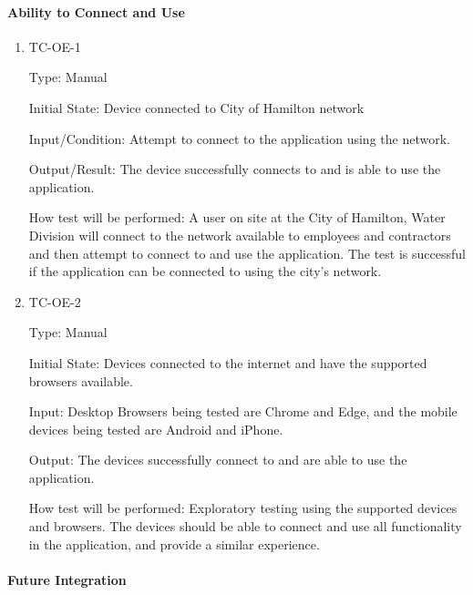\documentclass[12pt, titlepage]{article}
\begin{document}
\paragraph{Ability to Connect and Use}

\begin{enumerate}

  \item{TC-OE-1\\}

    Type: Manual

    Initial State: Device connected to City of Hamilton network

    Input/Condition: Attempt to connect to the application using
    the network.

    Output/Result: The device successfully connects to and is able to
    use the application.

    How test will be performed: A user on site at the City of
    Hamilton, Water Division will connect to the network available to
    employees and contractors and then attempt to connect to and use
    the application. The test is successful if the application can be
    connected to using the city's network.

  \item{TC-OE-2\\}

    Type: Manual

    Initial State: Devices connected to the internet and have the
    supported browsers available.

    Input: Desktop Browsers being tested are Chrome and Edge, and the
    mobile devices being tested are Android and iPhone.

    Output: The devices successfully connect to and are able to use
    the application.

    How test will be performed: Exploratory testing using the
    supported devices and browsers. The devices should be able to
    connect and use all functionality in the application, and provide
    a similar experience.

\end{enumerate}

\paragraph{Future Integration}
\end{document}
